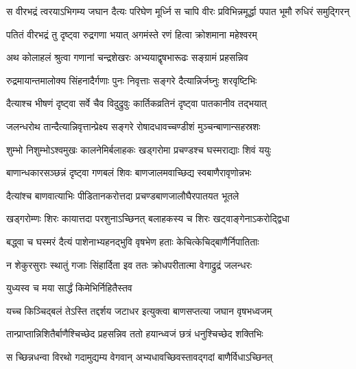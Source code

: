 \twolineshloka
{स वीरभद्रं त्वरयाऽभिगम्य जघान दैत्यः परिघेण मूर्ध्नि}
{स चापि वीरः प्रविभिन्नमूर्द्धा पपात भूमौ रुधिरं समुद्गिरन्} %





\twolineshloka
{पतितं वीरभद्रं तु दृष्ट्वा रुद्रगणा भयात्}
{अगमंस्ते रणं हित्वा क्रोशमाना महेश्वरम्} %

\twolineshloka
{अथ कोलाहलं श्रुत्वा गणानां चन्द्रशेखरः}
{अभ्ययाद्वृषभारूढः सङ्ग्रामं प्रहसन्निव} %

\twolineshloka
{रुद्रमायान्तमालोक्य सिंहनादैर्गणाः पुनः}
{निवृत्ताः सङ्गरे दैत्यान्निर्जघ्नुः शरवृष्टिभिः} %

\twolineshloka
{दैत्याश्च भीषणं दृष्ट्वा सर्वे चैव विदुद्रुवुः}
{कार्तिकव्रतिनं दृष्ट्वा पातकानीव तद्भयात्} %

\twolineshloka
{जलन्धरोथ तान्दैत्यान्निवृत्तान्प्रेक्ष्य सङ्गरे}
{रोषादधावच्चण्डीशं मुञ्चन्बाणान्सहस्रशः} %

\twolineshloka
{शुम्भो निशुम्भोऽश्वमुखः कालनेमिर्बलाहकः}
{खड्गरोमा प्रचण्डश्च घस्मराद्याः शिवं ययुः} %

\twolineshloka
{बाणान्धकारसञ्छन्नं दृष्ट्वा गणबलं शिवः}
{बाणजालमवाच्छिद्य स्वबाणैरावृणोन्नभः} %

\twolineshloka
{दैत्यांश्च बाणवात्याभिः पीडितानकरोत्तदा}
{प्रचण्डबाणजालौघैरपातयत भूतले} %

\twolineshloka
{खड्गरोम्णः शिरः कायात्तदा परशुनाऽच्छिनत्}
{बलाहकस्य च शिरः खट्वाङ्गेनाऽकरोद्द्विधा} %

\twolineshloka
{बद्ध्वा च घस्मरं दैत्यं पाशेनाभ्यहनद्भुवि}
{वृषभेण हताः केचित्केचिद्बाणैर्निपातिताः} %

\twolineshloka
{न शेकुरसुराः स्थातुं गजाः सिंहार्दिता इव}
{ततः क्रोधपरीतात्मा वेगाद्रुद्रं जलन्धरः} %




\onelineshloka
{युध्यस्व च मया सार्द्धं किमेभिर्निहितैस्तव} %

\twolineshloka
{यच्च किञ्चिद्बलं तेऽस्ति तद्दर्शय जटाधर}
{इत्युक्त्वा बाणसप्तत्या जघान वृषभध्वजम्} %

\twolineshloka
{तान्प्राप्तान्निशितैर्बाणैश्चिच्छेद प्रहसन्निव}
{ततो हयान्ध्वजं छत्रं धनुश्चिच्छेद शक्तिभिः} %

\twolineshloka
{स च्छिन्नधन्वा विरथो गदामुद्यम्य वेगवान्}
{अभ्यधावच्छिवस्तावद्गदां बाणैर्विधाऽच्छिनत्} %

